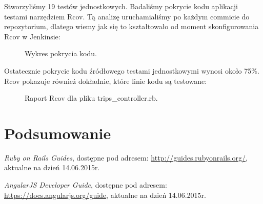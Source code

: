 \documentclass[eng,oneside]{mgr}
\begin{document}
Stworzyliśmy 19 testów jednostkowych. Badaliśmy pokrycie kodu aplikacji testami narzędziem Rcov. Tą analizę uruchamialiśmy po każdym commicie do repozytorium, dlatego wiemy jak się to kształtowało od moment skonfigurowania Rcov w Jenkinsie:
\begin{figure}[h]
	\centering
	\caption{Wykres pokrycia kodu.}
	\label{fig:testy}
\end{figure}

Ostatecznie pokrycie kodu źródłowego testami jednostkowymi wynosi około 75\%. Rcov pokazuje również dokładnie, które linie kodu są testowane:
\begin{figure}[h]
	\centering
	\caption{Raport Rcov dla pliku trips\_controller.rb.}
	\label{fig:raport}
\end{figure}
\chapter{Podsumowanie}

\begin{thebibliography}{inteligencja}
	
	\emph{Ruby on Rails Guides}, dostępne pod adresem: \url{http://guides.rubyonrails.org/},\\ aktualne na dzień 14.06.2015r.
	
	\emph{AngularJS Developer Guide}, dostępne pod adresem: \url{https://docs.angularjs.org/guide}, aktualne na dzień 14.06.2015r.
	
\end{thebibliography}
\end{document}
